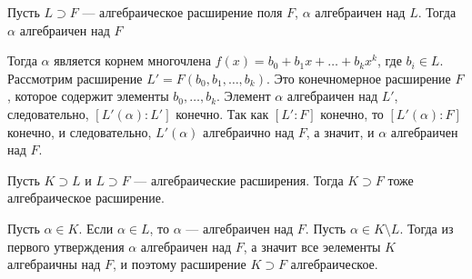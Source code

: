 \par \Statement Пусть $L \supset F$ — алгебраическое расширение поля $F$, $\alpha$ алгебраичен над $L$. Тогда $\alpha$ алгебраичен над $F$
\par \Proof Тогда $\alpha$ является корнем многочлена $f(x) = b_0 + b_1x + \ldots +b_kx^k$, где $b_i \in L$. Рассмотрим расширение $L' = F(b_0, b_1, \ldots, b_k)$. Это конечномерное расширение $F$, которое содержит элементы $b_0, \ldots, b_k$. Элемент $\alpha$ алгебраичен над $L'$, следовательно, $[L'(\alpha) : L']$ конечно. Так как $[L': F]$ конечно, то $[L'(\alpha):F]$ конечно, и следовательно, $L'(\alpha)$ алгебраично над $F$, а значит, и $\alpha$ алгебраичен над $F$. \EndProof
\par \Statement Пусть $K \supset L$ и $L \supset F$ — алгебраические расширения. Тогда $K \supset F$ тоже алгебраическое расширение.
\par \Proof Пусть $\alpha \in K$. Если $\alpha \in L$, то $\alpha$ — алгебраичен над $F$. Пусть $\alpha \in K \setminus L$. Тогда из первого утверждения $\alpha$ алгебраичен над $F$, а значит все эелементы $K$ алгебраичны над $F$, и поэтому расширение $K \supset F$ алгебраическое. \EndProof 
